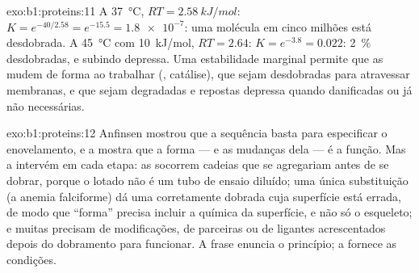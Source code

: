 \begin{solution}{exo:b1:proteins:11}
A \qty{37}{\celsius}, $RT = \qty{2.58}{kJ/mol}$: $K = e^{-40/2.58} =
e^{-15.5} = \num{1.8e-7}$: uma molécula em cinco milhões está
desdobrada. A \qty{45}{\celsius} com \qty{10}{kJ/mol}, $RT = 2.64$:
$K = e^{-3.8} =
0.022$: \qty{2}{\%} desdobradas, e subindo depressa. Uma estabilidade
marginal permite que as  mudem de forma ao trabalhar
(, catálise), que sejam desdobradas para atravessar membranas,
e que sejam degradadas e repostas depressa quando danificadas ou já não
necessárias.
\end{solution}

\begin{solution}{exo:b1:proteins:12}
Anfinsen mostrou que a sequência basta para especificar o enovelamento,
e a  mostra que a forma --- e as mudanças dela --- é a função.
Mas a  intervém em cada etapa: as  socorrem cadeias que
se agregariam antes de se dobrar, porque o  lotado não é um tubo
de ensaio diluído; uma única substituição (a anemia falciforme) dá uma
 corretamente dobrada cuja superfície está errada, de modo que
``forma'' precisa incluir a química da superfície, e não só o esqueleto;
e muitas  precisam de modificações, de parceiras ou de ligantes
acrescentados depois do dobramento para funcionar. A frase enuncia o
princípio; a  fornece as condições.
\end{solution}

